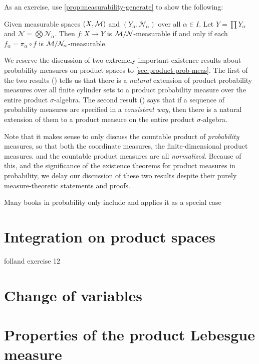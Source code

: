 As an exercise, use \cref{prop:measurability-generate} to show the following: 
\begin{xca}
    Given measurable spaces $(X,\mathcal{M})$ and $(Y_\alpha,\mathcal{N}_\alpha)$ over all $\alpha \in I$. Let $Y = \prod Y_\alpha$ and $\mathcal{N} = \bigotimes \mathcal{N}_\alpha$. Then $f\colon X \to Y$ is $\mathcal{M}/\mathcal{N}$-measurable if and only if each $f_\alpha = \pi_\alpha \circ f$ is $\mathcal{M}/\mathcal{N}_\alpha$-measurable.
\end{xca}


We reserve the discussion of two extremely important existence results about probability measures on product spaces to \cref{sec:product-prob-meas}. The first of the two results () tells us that there is a \emph{natural} extension of product probability measures over all finite cylinder sets to a product probability measure over the entire product $\sigma$-algebra.
The second result () says that if a sequence of probability measures are specified in a \emph{consistent way}, then there is a natural extension of them to a product measure on the entire product $\sigma$-algebra. 

Note that it makes sense to only discuss the countable product of \emph{probability} measures, so that both the coordinate measures, the finite-dimensional product measures. and the countable product measures are all \emph{normalized}. Because of this, and the significance of the existence theorems for product measures in probability, we delay our discussion of these two results despite their purely measure-theoretic statements and proofs.

Many books in probability only include and applies it as a special case

\section{Integration on product spaces} \label{sec:prod-integrate}
\begin{namedthm}
    
\end{namedthm}

folland exercise 12

\section{Change of variables} \label{sec:cov}

\section{Properties of the product Lebesgue measure}

